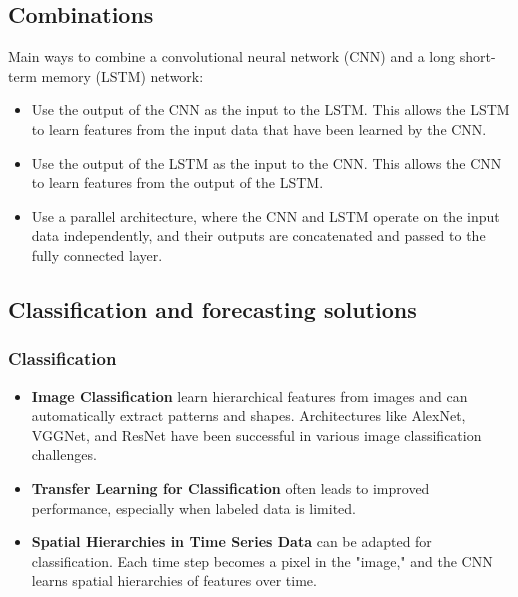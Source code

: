 \documentclass{article}
\begin{document}
\subsection{Combinations}
Main ways to combine a convolutional neural network (CNN) and a long short-term memory (LSTM) network:

\begin{itemize}
    \item Use the output of the CNN as the input to the LSTM. This allows the LSTM to learn features from the input data that have been learned by the CNN.
    \item Use the output of the LSTM as the input to the CNN. This allows the CNN to learn features from the output of the LSTM.
    \item Use a parallel architecture, where the CNN and LSTM operate on the input data independently, and their outputs are concatenated and passed to the fully connected layer.
\end{itemize}

\subsection{Classification and forecasting solutions}
\subsubsection{Classification}
\begin{itemize}
    \item \textbf{Image Classification}  learn hierarchical features from images and can automatically extract patterns and shapes. Architectures like AlexNet, VGGNet, and ResNet have been successful in various image classification challenges\cite{r3}.
    \item \textbf{Transfer Learning for Classification} often leads to improved performance, especially when labeled data is limited.
    \item \textbf{Spatial Hierarchies in Time Series Data} can be adapted for classification. Each time step becomes a pixel in the "image," and the CNN learns spatial hierarchies of features over time.
\end{itemize}
\end{document}

